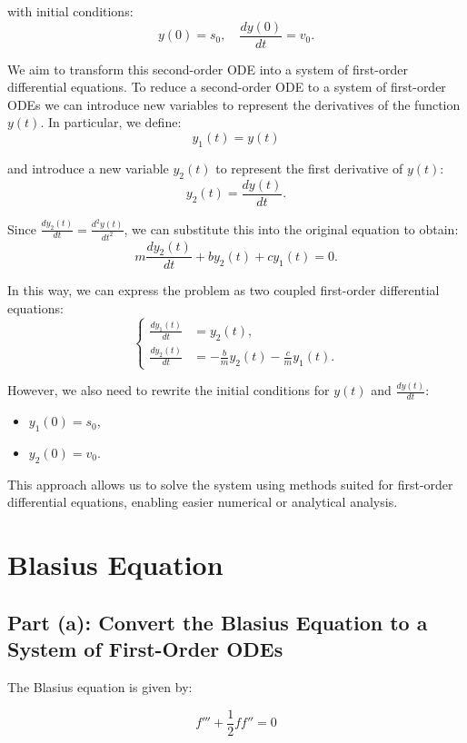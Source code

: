 \documentclass{article}
\begin{document}
with initial conditions:
\[
y(0) = s_0, \quad \frac{dy(0)}{dt} = v_0.
\]

We aim to transform this second-order ODE into a system of first-order differential equations. To reduce a second-order ODE to a 
system of first-order ODEs we can introduce new variables to represent the derivatives of the function \( y(t) \). 
In particular, we define:
\[
y_1(t) = y(t)
\]

and introduce a new variable \( y_2(t) \) to represent the first derivative of \( y(t) \):
\[
y_2(t) = \frac{dy(t)}{dt}.
\]

Since \( \frac{dy_2(t)}{dt} = \frac{d^2 y(t)}{dt^2} \), we can substitute this into the original equation to obtain:
\begin{equation}
m \frac{dy_2(t)}{dt} + b y_2(t) + c y_1(t) = 0.
\end{equation}

In this way, we can express the problem as two coupled first-order differential equations:
\[
\begin{cases}
\frac{dy_1(t)}{dt} &= y_2(t), \\
\frac{dy_2(t)}{dt} &= -\frac{b}{m} y_2(t) - \frac{c}{m} y_1(t).
\end{cases}
\]

However, we also need to rewrite the initial conditions for \( y(t) \) and \( \frac{dy(t)}{dt} \):
\begin{itemize}
    \item \( y_1(0) = s_0 \),
    \item \( y_2(0) = v_0 \).
\end{itemize}

This approach allows us to solve the system using methods suited for first-order differential equations, enabling easier numerical or analytical analysis.






\section{Blasius Equation}

\subsection*{Part (a): Convert the Blasius Equation to a System of First-Order ODEs}

The Blasius equation is given by:

\begin{equation}
f''' + \frac{1}{2} f f'' = 0
\end{equation}
\end{document}
